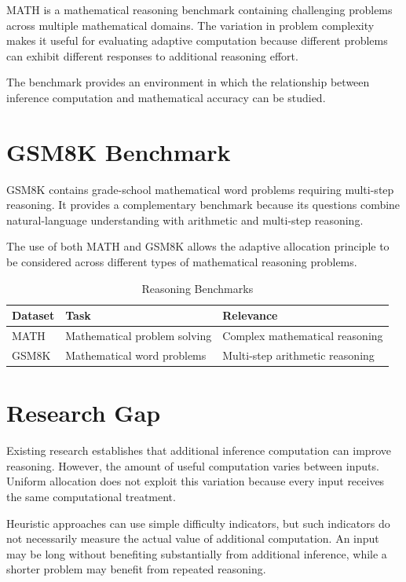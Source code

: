 \documentclass[12pt,a4paper,titlepage]{report}
\begin{document}
MATH is a mathematical reasoning benchmark containing challenging problems across multiple mathematical domains. The variation in problem complexity makes it useful for evaluating adaptive computation because different problems can exhibit different responses to additional reasoning effort.

The benchmark provides an environment in which the relationship between inference computation and mathematical accuracy can be studied.

\section{GSM8K Benchmark}

GSM8K contains grade-school mathematical word problems requiring multi-step reasoning. It provides a complementary benchmark because its questions combine natural-language understanding with arithmetic and multi-step reasoning.

The use of both MATH and GSM8K allows the adaptive allocation principle to be considered across different types of mathematical reasoning problems.

\begin{table}[H]
\centering
\caption{Reasoning Benchmarks}
\label{tab:datasets}
\small
\begin{tabular}{p{3cm}p{4.5cm}p{5cm}}
\toprule
\textbf{Dataset} & \textbf{Task} & \textbf{Relevance} \\
\midrule
MATH & Mathematical problem solving & Complex mathematical reasoning \\
GSM8K & Mathematical word problems & Multi-step arithmetic reasoning \\
\bottomrule
\end{tabular}
\end{table}

\section{Research Gap}

Existing research establishes that additional inference computation can improve reasoning. However, the amount of useful computation varies between inputs. Uniform allocation does not exploit this variation because every input receives the same computational treatment.

Heuristic approaches can use simple difficulty indicators, but such indicators do not necessarily measure the actual value of additional computation. An input may be long without benefiting substantially from additional inference, while a shorter problem may benefit from repeated reasoning.
\end{document}
